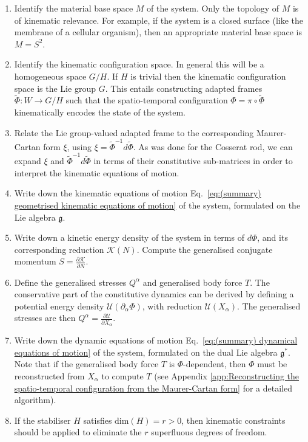 \begin{enumerate}

\item Identify the material base space $M$ of the system. Only the topology of $M$ is of kinematic relevance. For example, if the system is a closed surface (like the membrane of a cellular organism), then an appropriate material base space is $M = S^2$.

\item Identify the kinematic configuration space. In general this will be a homogeneous space $G/H$. If $H$ is trivial then the kinematic configuration space is the Lie group $G$. This entails constructing adapted frames $\tilde{\Phi} : W \to G/H$ such that the spatio-temporal configuration $\Phi = \pi \circ \tilde{\Phi}$ kinematically encodes the state of the system. 

\item Relate the Lie group-valued adapted frame to the corresponding Maurer-Cartan form $\xi$, using $\xi = \tilde{\Phi}^{-1} d \tilde{\Phi}$. As was done for the Cosserat rod, we can expand $\xi$  and $\tilde{\Phi}^{-1} d \tilde{\Phi}$ in terms of their constitutive sub-matrices in order to interpret the kinematic equations of motion.

\item Write down the kinematic equations of motion Eq.~\ref{eq:(summary) geometrised kinematic equations of motion} of the system, formulated on the Lie algebra $\mathfrak{g}$.

\item Write down a kinetic energy density of the system in terms of $d \Phi$, and its corresponding reduction $\mathcal{K}(N)$. Compute the generalised conjugate momentum $S = \frac{\partial \mathcal{K}}{\partial N}$.

\item Define the generalised stresses $Q^\alpha$ and generalised body force $T$. The conservative  part of the constitutive dynamics can be derived by defining a potential energy density $\mathcal{U}(\partial_\alpha \Phi)$, with reduction $\mathcal{U}(X_\alpha)$. The generalised stresses are then $Q^\alpha = \frac{\partial \mathcal{U}}{\partial X_\alpha}$.

\item Write down the dynamic equations of motion Eq.~\ref{eq:(summary) dynamical equations of motion} of the system, formulated on the dual Lie algebra $\mathfrak{g}^*$. Note that if the generalised body force $T$ is $\Phi$-dependent, then $\Phi$ must be reconstructed from $X_\alpha$ to compute $T$ (see Appendix \ref{app:Reconstructing the spatio-temporal configuration from the Maurer-Cartan form} for a detailed algorithm).

\item If the stabiliser $H$ satisfies $\text{dim}(H) = r > 0$, then kinematic constraints should be applied to eliminate the $r$ superfluous degrees of freedom.

\end{enumerate}

